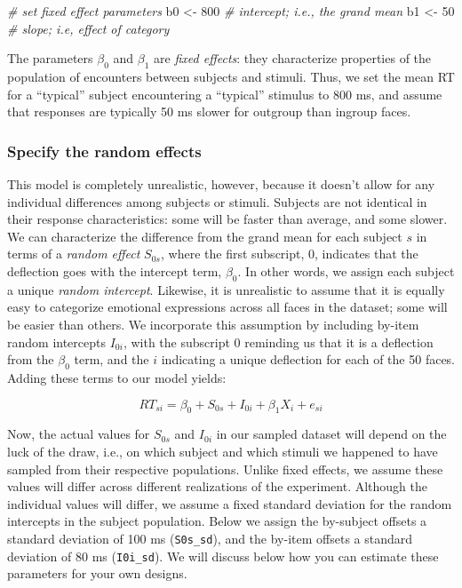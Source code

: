 \documentclass[doc,floatsintext]{apa6}
\newenvironment{Shaded}{\begin{snugshade}}{\end{snugshade}}
\newcommand{\CommentTok}[1]{\textcolor[rgb]{0.56,0.35,0.01}{\textit{#1}}}
\newcommand{\DecValTok}[1]{\textcolor[rgb]{0.00,0.00,0.81}{#1}}
\newcommand{\NormalTok}[1]{#1}
\newcommand{\StringTok}[1]{\textcolor[rgb]{0.31,0.60,0.02}{#1}}
\begin{document}
\begin{Shaded}
\begin{Highlighting}[]
\CommentTok{# set fixed effect parameters}
\NormalTok{b0 <-}\StringTok{ }\DecValTok{800} \CommentTok{# intercept; i.e., the grand mean}
\NormalTok{b1 <-}\StringTok{  }\DecValTok{50} \CommentTok{# slope; i.e, effect of category}
\end{Highlighting}
\end{Shaded}

\noindent The parameters \(\beta_0\) and \(\beta_1\) are \emph{fixed effects}: they characterize properties of the population of encounters between subjects and stimuli. Thus, we set the mean RT for a \enquote{typical} subject encountering a \enquote{typical} stimulus to 800 ms, and assume that responses are typically 50 ms slower for outgroup than ingroup faces.

\hypertarget{specify-the-random-effects}{%
\subsubsection{Specify the random effects}\label{specify-the-random-effects}}

This model is completely unrealistic, however, because it doesn't allow for any individual differences among subjects or stimuli. Subjects are not identical in their response characteristics: some will be faster than average, and some slower. We can characterize the difference from the grand mean for each subject \(s\) in terms of a \emph{random effect} \(S_{0s}\), where the first subscript, 0, indicates that the deflection goes with the intercept term, \(\beta_0\). In other words, we assign each subject a unique \emph{random intercept}. Likewise, it is unrealistic to assume that it is equally easy to categorize emotional expressions across all faces in the dataset; some will be easier than others. We incorporate this assumption by including by-item random intercepts \(I_{0i}\), with the subscript 0 reminding us that it is a deflection from the \(\beta_0\) term, and the \(i\) indicating a unique deflection for each of the 50 faces. Adding these terms to our model yields:

\begin{equation}
RT_{si} = \beta_0 + S_{0s} + I_{0i} + \beta_1 X_i + e_{si}
\end{equation}

Now, the actual values for \(S_{0s}\) and \(I_{0i}\) in our sampled dataset will depend on the luck of the draw, i.e., on which subject and which stimuli we happened to have sampled from their respective populations. Unlike fixed effects, we assume these values will differ across different realizations of the experiment. Although the individual values will differ, we assume a fixed standard deviation for the random intercepts in the subject population. Below we assign the by-subject offsets a standard deviation of 100 ms (\texttt{S0s\_sd}), and the by-item offsets a standard deviation of 80 ms (\texttt{I0i\_sd}). We will discuss below how you can estimate these parameters for your own designs.
\end{document}
